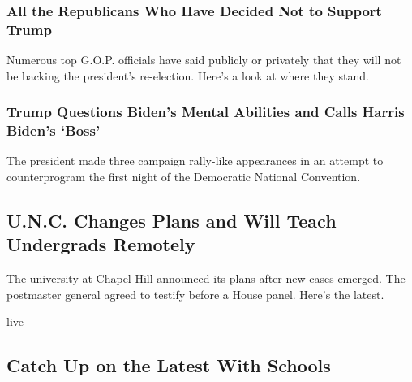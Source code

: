 \hypertarget{all-the-republicans-who-have-decided-not-to-support-trump}{%
\subsubsection{All the Republicans Who Have Decided Not to Support
Trump}\label{all-the-republicans-who-have-decided-not-to-support-trump}}

\href{https://www.nytimes.com/article/republicans-voting-for-biden-not-trump.html}{}

Numerous top G.O.P. officials have said publicly or privately that they
will not be backing the president's re-election. Here's a look at where
they stand.

\href{https://www.nytimes.com/2020/08/17/us/politics/trump-campaign-biden-harris.html}{}

\hypertarget{trump-questions-bidens-mental-abilities-and-calls-harris-bidens-boss}{%
\subsubsection{Trump Questions Biden's Mental Abilities and Calls Harris
Biden's
`Boss'}\label{trump-questions-bidens-mental-abilities-and-calls-harris-bidens-boss}}

\href{https://www.nytimes.com/2020/08/17/us/politics/trump-campaign-biden-harris.html}{}

The president made three campaign rally-like appearances in an attempt
to counterprogram the first night of the Democratic National Convention.

\href{/2020/08/17/world/coronavirus-covid.html}{}

\hypertarget{unc-changes-plans-and-will-teach-undergrads-remotely}{%
\subsection{U.N.C. Changes Plans and Will Teach Undergrads
Remotely}\label{unc-changes-plans-and-will-teach-undergrads-remotely}}

The university at Chapel Hill announced its plans after new cases
emerged. The postmaster general agreed to testify before a House panel.
Here's the latest.

live

\href{/2020/08/17/us/k-12-schools-reopening.html}{}

\hypertarget{catch-up-on-the-latest-with-schools}{%
\subsection{Catch Up on the Latest With
Schools}\label{catch-up-on-the-latest-with-schools}}

